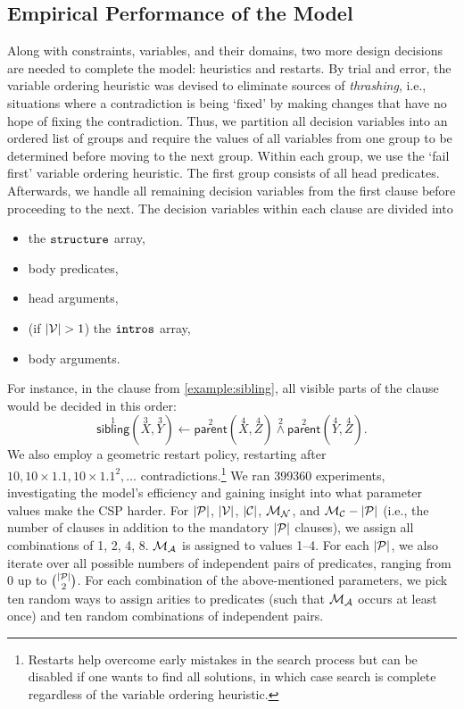 \subsection{Empirical Performance of the Model} \label{sec:1experiment1}

Along with constraints, variables, and their domains, two more design decisions
are needed to complete the model: heuristics and restarts. By trial and error,
the variable ordering heuristic was devised to eliminate sources of
\emph{thrashing}, i.e., situations where a contradiction is being `fixed' by
making changes that have no hope of fixing the contradiction. Thus, we partition
all decision variables into an ordered list of groups and require the values of
all variables from one group to be determined before moving to the next group.
Within each group, we use the `fail first' variable ordering heuristic. The
first group consists of all head predicates. Afterwards, we handle all remaining
decision variables from the first clause before proceeding to the next. The
decision variables within each clause are divided into
\begin{itemize}
\item the $\texttt{\textup{structure}}$ array,
\item body predicates,
\item head arguments,
\item (if $|\mathcal{V}{}| > 1$) the $\texttt{\textup{intros}}$ array,
\item body arguments.
\end{itemize}
For instance, in the clause from \cref{example:sibling}, all visible parts of
the clause would be decided in this order:
\[
  \overset{1}{\mathsf{sibling}}(\overset{3}{X}, \overset{3}{Y}) \gets
  \overset{2}{\mathsf{parent}}(\overset{4}{X}, \overset{4}{Z})
  \overset{2}{\land} \overset{2}{\mathsf{parent}}(\overset{4}{Y},
  \overset{4}{Z}).
\]
We also employ a geometric restart policy, restarting after $10, 10 \times 1.1,
10 \times 1.1^2, \dots$ contradictions.\footnote{Restarts help overcome early
  mistakes in the search process but can be disabled if one wants to find all
  solutions, in which case search is complete regardless of the variable
  ordering heuristic.} We ran \num{399360} experiments, investigating the
model's efficiency and gaining insight into what parameter values make the CSP
harder. For $|\mathcal{P}{}|$, $|\mathcal{V}{}|$, $|\mathcal{C}{}|$,
$\mathcal{M}_{\mathcal{N}}{}$, and $\mathcal{M}_{\mathcal{C}}{} - |\mathcal{P}{}|$ (i.e., the number of
clauses in addition to the mandatory $|\mathcal{P}{}|$ clauses), we assign all
combinations of 1, 2, 4, 8. $\mathcal{M}_{\mathcal{A}}{}$ is assigned to values 1--4. For each
$|\mathcal{P}{}|$, we also iterate over all possible numbers of independent
pairs of predicates, ranging from 0 up to $\binom{|\mathcal{P}{}|}{2}$. For each
combination of the above-mentioned parameters, we pick ten random ways to assign
arities to predicates (such that $\mathcal{M}_{\mathcal{A}}{}$ occurs at least once) and ten
random combinations of independent pairs.

